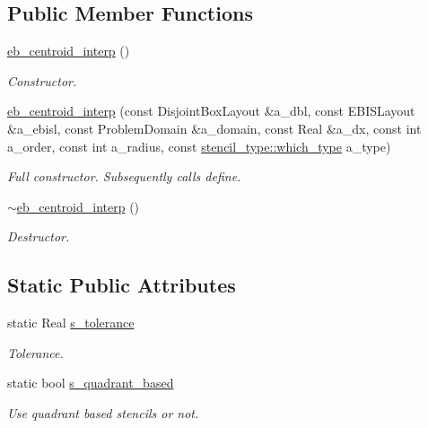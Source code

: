 \subsection*{Public Member Functions}
\begin{DoxyCompactItemize}
\item 
\hyperlink{classeb__centroid__interp_afe8d81c7e9d46c83df49c164d2e5a2be}{eb\+\_\+centroid\+\_\+interp} ()
\begin{DoxyCompactList}\small\item\em Constructor. \end{DoxyCompactList}\item 
\hyperlink{classeb__centroid__interp_acc9a696520bd45abe11ced0d41f33016}{eb\+\_\+centroid\+\_\+interp} (const Disjoint\+Box\+Layout \&a\+\_\+dbl, const E\+B\+I\+S\+Layout \&a\+\_\+ebisl, const Problem\+Domain \&a\+\_\+domain, const Real \&a\+\_\+dx, const int a\+\_\+order, const int a\+\_\+radius, const \hyperlink{namespacestencil__type_a1ffed19935b7289b50e8dcc017ee99c8}{stencil\+\_\+type\+::which\+\_\+type} a\+\_\+type)
\begin{DoxyCompactList}\small\item\em Full constructor. Subsequently calls define. \end{DoxyCompactList}\item 
\hyperlink{classeb__centroid__interp_a5df308d20afc3f8e8768aa8f0a30ff68}{$\sim$eb\+\_\+centroid\+\_\+interp} ()
\begin{DoxyCompactList}\small\item\em Destructor. \end{DoxyCompactList}\end{DoxyCompactItemize}
\subsection*{Static Public Attributes}
\begin{DoxyCompactItemize}
\item 
static Real \hyperlink{classeb__centroid__interp_a1c292a8b3cedbd4e60fcdb30e73a6554}{s\+\_\+tolerance}
\begin{DoxyCompactList}\small\item\em Tolerance. \end{DoxyCompactList}\item 
static bool \hyperlink{classeb__centroid__interp_a45b9c841abe67a720906f4ab74922205}{s\+\_\+quadrant\+\_\+based}
\begin{DoxyCompactList}\small\item\em Use quadrant based stencils or not. \end{DoxyCompactList}\end{DoxyCompactItemize}
